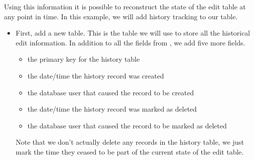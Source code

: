 \documentclass[a4paper,11pt,english]{sphinxmanual}
\begin{document}
Using this information it is possible to reconstruct the state of the edit table at any point in time. In this example, we will add history tracking to our  table.
\begin{itemize}
\item {} 
First, add a new  table. This is the table we will use to store all the historical edit information. In addition to all the fields from , we add five more fields.
\begin{itemize}
\item {} 
 the primary key for the history table

\item {} 
 the date/time the history record was created

\item {} 
 the database user that caused the record to be created

\item {} 
 the date/time the history record was marked as deleted

\item {} 
 the database user that caused the record to be marked as deleted

\end{itemize}

Note that we don’t actually delete any records in the history table, we just mark the time they ceased to be part of the current state of the edit table.

\begin{sphinxVerbatim}[commandchars=\\\{\}]
   
     
   
   
   
   
   
   
   
   
   
\end{sphinxVerbatim}


\end{itemize}
\end{document}
